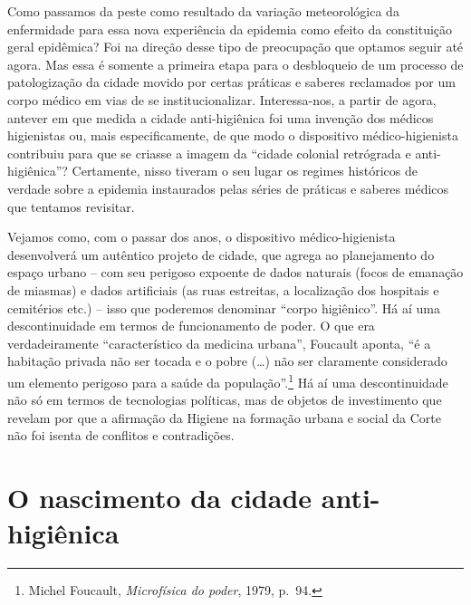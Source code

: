 Como passamos da peste como resultado da variação meteorológica da
enfermidade para essa nova experiência da epidemia como efeito da
constituição geral epidêmica? Foi na direção desse tipo de preocupação
que optamos seguir até agora. Mas essa é somente a primeira etapa para o
desbloqueio de um processo de patologização da cidade movido por certas
práticas e saberes reclamados por um corpo médico em vias de se
institucionalizar. Interessa-nos, a partir de agora, antever em que
medida a cidade anti-higiênica foi uma invenção dos médicos higienistas
ou, mais especificamente, de que modo o dispositivo médico-higienista
contribuiu para que se criasse a imagem da ``cidade colonial retrógrada
e anti-higiênica''? Certamente, nisso tiveram o seu lugar os regimes
históricos de verdade sobre a epidemia instaurados pelas séries de
práticas e saberes médicos que tentamos revisitar.

Vejamos como, com o passar dos anos, o dispositivo médico-higienista
desenvolverá um autêntico projeto de cidade, que agrega ao planejamento
do espaço urbano -- com seu perigoso expoente de dados naturais (focos
de emanação de miasmas) e dados artificiais (as ruas estreitas, a
localização dos hospitais e cemitérios etc.) -- isso que poderemos
denominar ``corpo higiênico''. Há aí uma descontinuidade em termos de
funcionamento de poder. O que era verdadeiramente ``característico da
medicina urbana'', Foucault aponta, ``é a habitação privada não ser
tocada e o pobre (\ldots{}) não ser claramente considerado um elemento
perigoso para a saúde da população''.\footnote{Michel Foucault,
  \emph{Microfísica do poder}, 1979, p.~94.} Há aí uma descontinuidade
não só em termos de tecnologias políticas, mas de objetos de
investimento que revelam por que a afirmação da Higiene na formação
urbana e social da Corte não foi isenta de conflitos e contradições.

\chapter{O nascimento da cidade
anti-higiênica}

